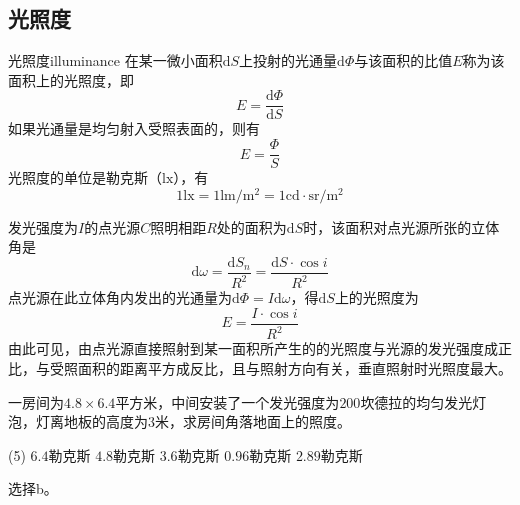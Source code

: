 \documentclass[cn,10pt,chinesefont=founder,math=mtpro2,cite=super,toc=onecol,twoside,openany]{elegantbook}
\begin{document}
\subsection{光照度}
\begin{definition}{光照度}{illuminance}
在某一微小面积$\mathrm{d}S$上投射的光通量$\mathrm{d}\varPhi$与该面积的比值$E$称为该面积上的光照度，即
\begin{equation}
E=\frac{\mathrm{d}\varPhi}{\mathrm{d}S}
\end{equation}
如果光通量是均匀射入受照表面的，则有
\begin{equation}
E=\frac{\varPhi}{S}
\end{equation}
光照度的单位是勒克斯（$\mathrm{lx}$），有
\begin{equation}
1\mathrm{lx}=1\mathrm{lm/m^2}=1\mathrm{cd\cdot sr/m^2}
\end{equation}
\end{definition}
\begin{note}
	发光强度为$I$的点光源$C$照明相距$R$处的面积为$\mathrm{d}S$时，该面积对点光源所张的立体角是
	\begin{equation}
	\mathrm{d}\omega=\frac{\mathrm{d}S_n}{R^2}=\frac{\mathrm{d}S\cdot\cos i}{R^2}
	\end{equation}
	点光源在此立体角内发出的光通量为$\mathrm{d}\varPhi=I\mathrm{d}\omega$，得$\mathrm{d}S$上的光照度为
	\begin{equation}
	E=\frac{I\cdot\cos i}{R^2}
	\end{equation}
	由此可见，由点光源直接照射到某一面积所产生的的光照度与光源的发光强度成正比，与受照面积的距离平方成反比，且与照射方向有关，垂直照射时光照度最大。
\end{note}

\begin{problem}
	一房间为$4.8\times6.4$平方米，中间安装了一个发光强度为$200$坎德拉的均匀发光灯泡，灯离地板的高度为$3$米，求房间角落地面上的照度。  
	\begin{tasks}(5)
		\task $6.4$勒克斯
		\task $4.8$勒克斯
		\task $3.6$勒克斯
		\task $0.96$勒克斯
		\task $2.89$勒克斯
	\end{tasks}
\end{problem}
\begin{solution}
	选择b。
\end{solution}
\end{document}
